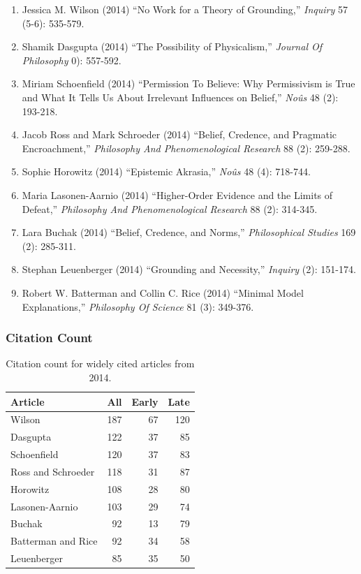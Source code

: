\documentclass[
  10pt,
  letterpaper,
  DIV=11,
  numbers=noendperiod,
  twoside]{scrartcl}
\providecommand{\tightlist}{%
  \setlength{\itemsep}{0pt}\setlength{\parskip}{0pt}}\usepackage{longtable,booktabs,array}
\begin{document}
\begin{enumerate}
\def\labelenumi{\arabic{enumi}.}
\tightlist
\item
  Jessica M. Wilson (2014) ``No Work for a Theory of Grounding,''
  \emph{Inquiry} 57 (5-6): 535-579.
\item
  Shamik Dasgupta (2014) ``The Possibility of Physicalism,''
  \emph{Journal Of Philosophy} 0): 557-592.
\item
  Miriam Schoenfield (2014) ``Permission To Believe: Why Permissivism is
  True and What It Tells Us About Irrelevant Influences on Belief,''
  \emph{Noûs} 48 (2): 193-218.
\item
  Jacob Ross and Mark Schroeder (2014) ``Belief, Credence, and Pragmatic
  Encroachment,'' \emph{Philosophy And Phenomenological Research} 88
  (2): 259-288.
\item
  Sophie Horowitz (2014) ``Epistemic Akrasia,'' \emph{Noûs} 48 (4):
  718-744.
\item
  Maria Lasonen-Aarnio (2014) ``Higher-Order Evidence and the Limits of
  Defeat,'' \emph{Philosophy And Phenomenological Research} 88 (2):
  314-345.
\item
  Lara Buchak (2014) ``Belief, Credence, and Norms,''
  \emph{Philosophical Studies} 169 (2): 285-311.
\item
  Stephan Leuenberger (2014) ``Grounding and Necessity,'' \emph{Inquiry}
  (2): 151-174.
\item
  Robert W. Batterman and Collin C. Rice (2014) ``Minimal Model
  Explanations,'' \emph{Philosophy Of Science} 81 (3): 349-376.
\end{enumerate}

\subsubsection*{Citation Count}\label{sec-count-2014}

\begin{longtable}[]{@{}lrrr@{}}

\caption{\label{tbl-citation-count-2014}Citation count for widely cited
articles from 2014.}

\tabularnewline

\toprule\noalign{}
Article & All & Early & Late \\
\midrule\noalign{}
\endhead
\bottomrule\noalign{}
\endlastfoot
Wilson & 187 & 67 & 120 \\
Dasgupta & 122 & 37 & 85 \\
Schoenfield & 120 & 37 & 83 \\
Ross and Schroeder & 118 & 31 & 87 \\
Horowitz & 108 & 28 & 80 \\
Lasonen-Aarnio & 103 & 29 & 74 \\
Buchak & 92 & 13 & 79 \\
Batterman and Rice & 92 & 34 & 58 \\
Leuenberger & 85 & 35 & 50 \\

\end{longtable}
\end{document}
